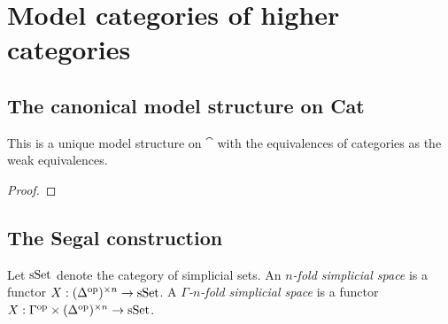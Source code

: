 \documentclass[a4paper]{amsart}
\begin{document}
\section{Model categories of higher categories}

\subsection{The canonical model structure on Cat}


\begin{theorem}
	This is a unique model structure on $\cat$ with the equivalences of categories as the weak equivalences. 
\end{theorem}

\begin{proof}
\end{proof}


\subsection{The Segal construction} \label{sec-SegalConstruction}



\begin{definition}
	Let $\mathrm{sSet}$ denote the category of simplicial sets. An {\em $n$-fold simplicial space} is a functor $X: (\Delta^\textrm{op})^{\times n} \to \mathrm{sSet}$. A {\em $\Gamma$-$n$-fold simplicial space} is a functor $X: \Gamma^\textrm{op} \times (\Delta^\textrm{op})^{\times n} \to \mathrm{sSet}$.
\end{definition}
\end{document}
